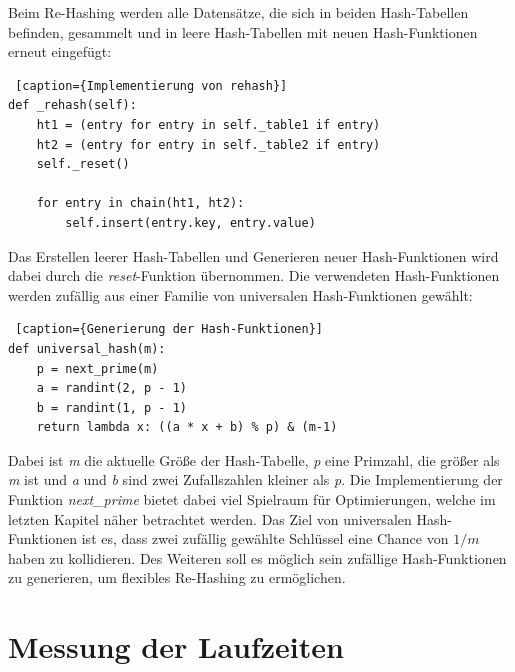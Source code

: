 Beim Re-Hashing werden alle Datensätze, die sich in beiden Hash-Tabellen befinden, gesammelt und in leere Hash-Tabellen mit neuen Hash-Funktionen erneut eingefügt:
\begin{lstlisting} [caption={Implementierung von rehash}]
def _rehash(self):
    ht1 = (entry for entry in self._table1 if entry)
    ht2 = (entry for entry in self._table2 if entry)
    self._reset()

    for entry in chain(ht1, ht2):
        self.insert(entry.key, entry.value)
\end{lstlisting}
Das Erstellen leerer Hash-Tabellen und Generieren neuer Hash-Funktionen wird dabei durch die \textit{reset}-Funktion übernommen. Die verwendeten Hash-Funktionen werden zufällig aus einer Familie von universalen Hash-Funktionen gewählt:
\begin{lstlisting} [caption={Generierung der Hash-Funktionen}]
def universal_hash(m):
    p = next_prime(m)
    a = randint(2, p - 1)
    b = randint(1, p - 1)
    return lambda x: ((a * x + b) % p) & (m-1)
\end{lstlisting}
Dabei ist \textit{m} die aktuelle Größe der Hash-Tabelle, \textit{p} eine Primzahl, die größer als \textit{m} ist und \textit{a} und \textit{b} sind zwei Zufallszahlen kleiner als \textit{p}. Die Implementierung der Funktion \textit{next\_prime} bietet dabei viel Spielraum für Optimierungen, welche im letzten Kapitel näher betrachtet werden. Das Ziel von universalen Hash-Funktionen ist es, dass zwei zufällig gewählte Schlüssel eine Chance von \(1/m\) haben zu kollidieren. Des Weiteren soll es möglich sein zufällige Hash-Funktionen zu generieren, um flexibles Re-Hashing zu ermöglichen.

\chapter{Messung der Laufzeiten}

